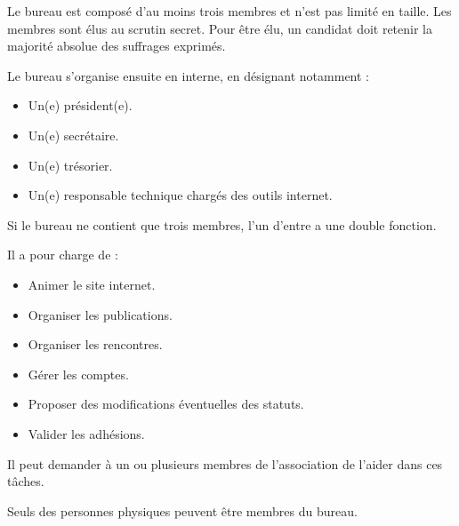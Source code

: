 \documentclass[11pt]{article}
\begin{document}
Le bureau est composé d'au moins trois membres et n'est pas limité en taille. Les membres sont élus au scrutin secret. Pour être élu, un candidat doit retenir la majorité absolue des suffrages exprimés.

Le bureau s'organise ensuite en interne, en désignant notamment :
\begin{itemize}
	\item Un(e) président(e).
	\item Un(e) secrétaire.
	\item Un(e) trésorier.
	\item Un(e) responsable technique chargés des outils internet.
\end{itemize}
Si le bureau ne contient que trois membres, l'un d'entre a une double fonction. 

Il a pour charge de :
\begin{itemize}
	\item Animer le site internet.
	\item Organiser les publications.
	\item Organiser les rencontres.
	\item Gérer les comptes.
	\item Proposer des modifications éventuelles des statuts.
	\item Valider les adhésions.
\end{itemize}

Il peut demander à un ou plusieurs membres de l'association de l'aider dans ces tâches.

Seuls des personnes physiques peuvent être membres du bureau.
\end{document}
